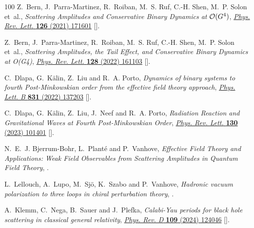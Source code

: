 \documentclass[12pt,a4paper]{article}
\theoremstyle{plain}
\theoremstyle{remark}
\begin{document}
\begin{thebibliography}{100}
Z.~Bern, J.~Parra-Martinez, R.~Roiban, M.~S. Ruf, C.-H. Shen, M.~P. Solon
  et~al., \emph{{Scattering Amplitudes and Conservative Binary Dynamics at
  ${\cal O}(G^4)$}},
  \href{https://doi.org/10.1103/PhysRevLett.126.171601}{\emph{Phys. Rev. Lett.}
  {\bfseries 126} (2021) 171601}
  [\href{https://arxiv.org/abs/2101.07254}{{}}].

Z.~Bern, J.~Parra-Martinez, R.~Roiban, M.~S. Ruf, C.-H. Shen, M.~P. Solon
  et~al., \emph{{Scattering Amplitudes, the Tail Effect, and Conservative
  Binary Dynamics at O(G4)}},
  \href{https://doi.org/10.1103/PhysRevLett.128.161103}{\emph{Phys. Rev. Lett.}
  {\bfseries 128} (2022) 161103}
  [\href{https://arxiv.org/abs/2112.10750}{{}}].

C.~Dlapa, G.~K{\"a}lin, Z.~Liu and R.~A. Porto, \emph{{Dynamics of binary
  systems to fourth Post-Minkowskian order from the effective field theory
  approach}}, \href{https://doi.org/10.1016/j.physletb.2022.137203}{\emph{Phys.
  Lett. B} {\bfseries 831} (2022) 137203}
  [\href{https://arxiv.org/abs/2106.08276}{{}}].

C.~Dlapa, G.~K{\"a}lin, Z.~Liu, J.~Neef and R.~A. Porto, \emph{{Radiation
  Reaction and Gravitational Waves at Fourth Post-Minkowskian Order}},
  \href{https://doi.org/10.1103/PhysRevLett.130.101401}{\emph{Phys. Rev. Lett.}
  {\bfseries 130} (2023) 101401}
  [\href{https://arxiv.org/abs/2210.05541}{{}}].

N.~E.~J. Bjerrum-Bohr, L.~Plant{\'e} and P.~Vanhove, \emph{{Effective Field
  Theory and Applications: Weak Field Observables from Scattering Amplitudes in
  Quantum Field Theory}},  \href{https://arxiv.org/abs/2212.08957}{{}}.

L.~Lellouch, A.~Lupo, M.~Sj{\"o}, K.~Szabo and P.~Vanhove, \emph{{Hadronic
  vacuum polarization to three loops in chiral perturbation theory}},
  \href{https://arxiv.org/abs/2510.12885}{{}}.

A.~Klemm, C.~Nega, B.~Sauer and J.~Plefka, \emph{{Calabi-Yau periods for black
  hole scattering in classical general relativity}},
  \href{https://doi.org/10.1103/PhysRevD.109.124046}{\emph{Phys. Rev. D}
  {\bfseries 109} (2024) 124046}
  [\href{https://arxiv.org/abs/2401.07899}{{}}].


\end{thebibliography}
\end{document}

